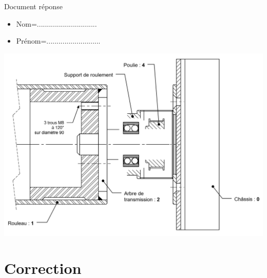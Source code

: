 \newpage

Document réponse

\begin{itemize}
 \item Nom=..............................
 \item Prénom=...........................
\end{itemize}

\begin{center}
 \includegraphics[angle=-90,width=0.9\linewidth]{img/DR2}
\end{center}

\ifdef{\public}{}{}

\newpage
\cleardoublepage

\pagestyle{correction}

\setcounter{equation}{0}

\section{Correction}



